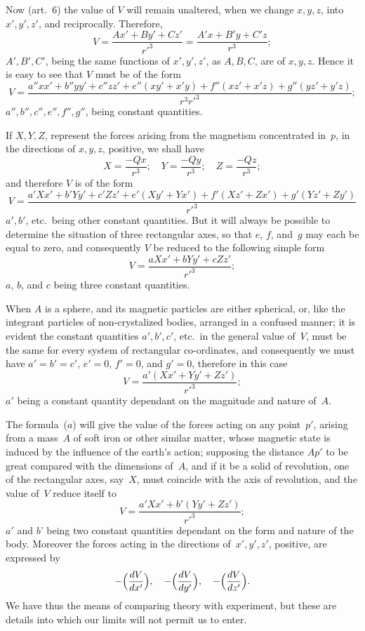 \documentclass[11pt,notitlepage]{amsart}
\begin{document}
Now (art.~6) the value of $V$ will remain unaltered, when we change
$x,y,z$, into~$x',y',z'$, and reciprocally. Therefore,
\[
V=\frac{Ax'+By'+Cz'}{r'^3}
=\frac{A'x+B'y+C'z}{r^3};
\]
$A',B',C'$, being the same functions of $x',y',z'$, as $A,B,C$, are of
$x,y,z$. Hence it is easy to see that $V$ must be of the form
\[
V=\frac{a''xx'+b''yy'+c''zz'+e''(xy'+x'y)+f''(xz'+x'z)+g''(yz'+y'z)}{r^3r'^3};
\]
$a'',b'',c'',e'',f'',g''$, being constant quantities.

If $X, Y, Z$, represent the forces arising from the magnetism concentrated
in~$p$, in the directions of $x,y,z$, positive, we shall have
\[
X=\frac{-Qx}{r^3};\quad
Y=\frac{-Qy}{r^3};\quad
Z=\frac{-Qz}{r^3};
\]
and therefore $V$ is of the form
\[
V=\frac{a'Xx'+b'Yy'+c'Zz'+e'(Xy'+Yx')+f'(Xz'+Zx')+g'(Yz'+Zy')}{r'^3}
\]
$a',b'$, etc.\ being other constant quantities.
But it will always be possible to
determine the situation of three rectangular axes, so that $e$, $f$,
and~$g$ may
each be equal to zero, and consequently $V$ be reduced to the following
simple form
\[
\tag{$a$.}
V=\frac{aXx'+bYy'+cZz'}{r'^3};
\]
$a$, $b$, and $c$ being three constant quantities.

When $A$ is a sphere, and its magnetic particles are either spherical,
or, like the integrant particles of non-crystalized bodies, arranged in a 
confused manner; it is evident the constant quantities $a',b',c'$, etc.\ in the
general value of~$V$, must be the same for every system of rectangular
co-ordinates, and consequently we must have $a'=b'=c'$, $e'=0$, $f'=0$,
and $g'=0$, therefore in this case
\[
\tag{$b$.}
V=\frac{a'(Xx'+Yy'+Zz')}{r'^3};
\]
$a'$ being a constant quantity dependant on the magnitude and nature of~$A$.

The formula~($a$) will give the value of the forces acting on any
point~$p'$, arising from a mass~$A$ of soft iron or other similar matter, whose
magnetic state is induced by the influence of the earth's action; supposing the
distance $Ap'$ to be great compared with the dimensions of~$A$, and if it be a
solid of revolution, one of the rectangular axes, say~$X$, must coincide with
the axis of revolution, and the value of~$V$ reduce itself to
\[
V=\frac{a'Xx'+b'(Yy'+Zz')}{r'^3};
\]
$a'$ and $b$' being two constant quantities dependant on the form and nature of
the body. Moreover the forces acting in the directions of~$x',y',z'$, positive,
are expressed by
\[
-\Bigl(\frac{dV}{dx'}\Bigr),\quad
-\Bigl(\frac{dV}{dy'}\Bigr),\quad
-\Bigl(\frac{dV}{dz'}\Bigr).
\]
We have thus the means of comparing theory with experiment, but these are
details into which our limits will not permit us to enter.
\end{document}
